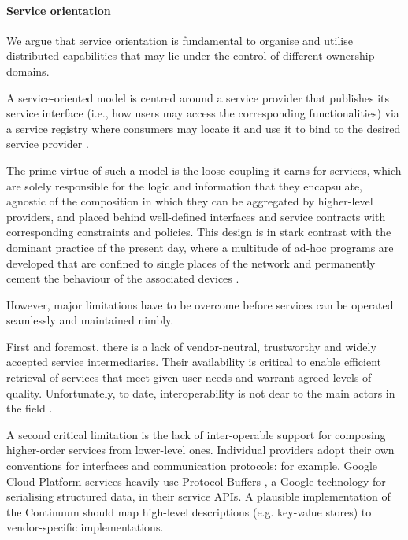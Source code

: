 \paragraph{Service orientation}\label{p:service-orientation}
We argue that service orientation is fundamental to organise and utilise distributed capabilities that may lie under the control of different ownership domains. 

A service-oriented model is centred around a service provider that publishes its service interface (i.e., how users may access the corresponding functionalities) via a service registry where consumers may locate it and use it to bind to the desired service provider \cite{haller2008internet}.

The prime virtue of such a model is the loose coupling it earns for services, which are solely responsible for the logic and information that they encapsulate, agnostic of the composition in which they can be aggregated by higher-level providers, and placed behind well-defined interfaces and service contracts with corresponding constraints and policies.
This design is in stark contrast with the dominant practice of the present day, where a multitude of ad-hoc programs are developed that are confined to single places of the network and permanently cement the behaviour of the associated devices \cite{beckman2020harnessing}.

However, major limitations have to be overcome before services can be operated seamlessly and maintained nimbly.  

First and foremost, there is a lack of vendor-neutral, trustworthy and widely accepted service intermediaries. Their availability is critical to enable efficient retrieval of services that meet given user needs and warrant agreed levels of quality. Unfortunately, to date, interoperability is not dear to the main actors in the field \textcolor{red}{\cite{grozev2014inter}}.

A second critical limitation is the lack of inter-operable support for composing higher-order services from lower-level ones. 
Individual providers adopt their own conventions for interfaces and communication protocols: for example, Google Cloud Platform services heavily use Protocol Buffers \cite{protobuf}, a Google technology for serialising structured data, in their service APIs. 
A plausible implementation of the Continuum should map high-level descriptions (e.g. key-value stores) to vendor-specific implementations.

